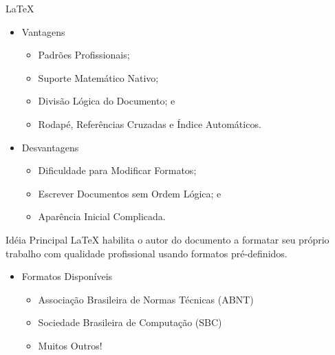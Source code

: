 \documentclass[hyperref={pdfpagelabels=false}]{beamer}
\begin{document}
\begin{frame}{\LaTeX{}}
    \begin{itemize}
        \item Vantagens \cite{oetiker2008}
        \begin{itemize}
            \item Padrões Profissionais;
            \item Suporte Matemático Nativo;
            \item Divisão Lógica do Documento; e
            \item Rodapé, Referências Cruzadas e Índice Automáticos.
        \end{itemize}
        \pause{}
        \item Desvantagens
        \begin{itemize}
            \item Dificuldade para Modificar Formatos;
            \item Escrever Documentos sem Ordem Lógica; e
            \item Aparência Inicial Complicada.
        \end{itemize}
    \end{itemize}
\end{frame}

\begin{frame}{Idéia Principal}
    \LaTeX{} \cite{oetiker2008} habilita o autor do documento a formatar seu
    próprio trabalho com qualidade profissional usando formatos
    \alert{pré-definidos}.
    \pause{}
    \begin{itemize}
        \item Formatos Disponíveis
        \begin{itemize}
            \item Associação Brasileira de Normas Técnicas (ABNT)
            \item Sociedade Brasileira de Computação (SBC)
            \item Muitos Outros!
        \end{itemize}
    \end{itemize}
\end{frame}
\end{document}
